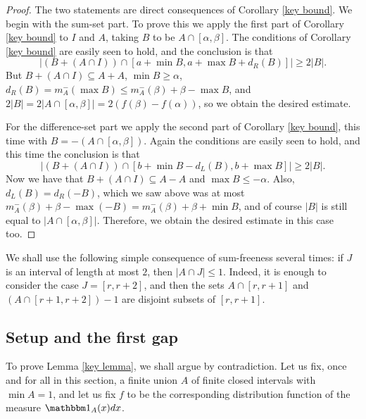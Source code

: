 \documentclass[11pt,reqno]{amsart}
\theoremstyle{definition}
\def\a{\alpha}
\def\be{\beta}
\def\F#1{f(#1)}
\def\subset{\subseteq}
\begin{document}
\begin{proof}
The two statements are direct consequences of Corollary \ref{key bound}. We begin with the sum-set part. To prove this we apply the first part of Corollary \ref{key bound} to $I$ and $A$, taking $B$ to be $A\cap[\a,\be]$. The conditions of Corollary \ref{key bound} are easily seen to hold, and the conclusion is that
\[\big|(B+(A\cap I))\cap[a+\min B,a+\max B+d_R(B)]\big|\geq 2|B|.\]
But $B+(A\cap I)\subset A+A$, $\min B\geq\a$, $d_R(B)=m_A^-(\max B)\leq m_A^-(\beta)+\beta-\max B$, and $2|B|=2|A\cap[\a,\be]|=2(\F{\be}-\F{\a})$, so we obtain the desired estimate.

For the difference-set part we apply the second part of Corollary \ref{key bound}, this time with $B=-(A\cap[\a,\be])$. Again the conditions are easily seen to hold, and this time the conclusion is that
\[\big|(B+(A\cap I))\cap[b+\min B-d_L(B), b+\max B]\big|\geq 2|B|.\]
Now we have that $B+(A\cap I)\subset A-A$ and $\max B\leq-\a$. Also, $d_L(B)=d_R(-B)$, which we saw above was at most $m_A^-(\be)+\beta-\max(-B)=m_A^-(\be)+\beta+\min B$, and of course $|B|$ is still equal to $|A\cap[\a,\be]|$. Therefore, we obtain the desired estimate in this case too.
\end{proof}


We shall use the following simple consequence of sum-freeness several times:
if $J$ is an interval of length at most $2$, then $|A\cap J|\leq 1$.
Indeed, it is enough to consider the case $J=[r,r+2]$, and then the sets
$A\cap[r,r+1]$ and $(A\cap[r+1,r+2])-1$ are disjoint subsets of $[r,r+1]$.
\subsection{Setup and the first gap}

To prove Lemma \ref{key lemma}, we shall argue by contradiction. Let us fix, once and for all in this section, a finite union $A$ of finite closed intervals with $\min A =1$, and let us fix $f$ to be the corresponding distribution function of the measure $\mathbbm 1_A(x)dx$.
 
\end{document}
